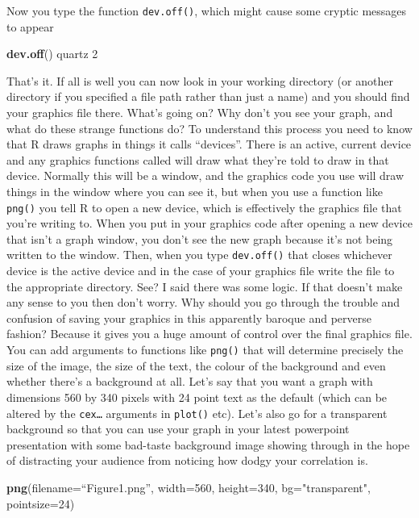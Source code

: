 \documentclass[
]{book}
\newenvironment{Shaded}{\begin{snugshade}}{\end{snugshade}}
\newcommand{\DataTypeTok}[1]{\textcolor[rgb]{0.13,0.29,0.53}{#1}}
\newcommand{\DecValTok}[1]{\textcolor[rgb]{0.00,0.00,0.81}{#1}}
\newcommand{\KeywordTok}[1]{\textcolor[rgb]{0.13,0.29,0.53}{\textbf{#1}}}
\newcommand{\NormalTok}[1]{#1}
\newcommand{\StringTok}[1]{\textcolor[rgb]{0.31,0.60,0.02}{#1}}
\begin{document}
Now you type the function \texttt{dev.off()}, which might cause some cryptic messages to appear

\begin{Shaded}
\begin{Highlighting}[]
\KeywordTok{dev.off}\NormalTok{()}
\NormalTok{quartz }
    \DecValTok{2}
\end{Highlighting}
\end{Shaded}

That's it. If all is well you can now look in your working directory (or another directory if you specified a file path rather than just a name) and you should find your graphics file there. What's going on? Why don't you see your graph, and what do these strange functions do? To understand this process you need to know that R draws graphs in things it calls ``devices''. There is an active, current device and any graphics functions called will draw what they're told to draw in that device. Normally this will be a window, and the graphics code you use will draw things in the window where you can see it, but when you use a function like \texttt{png()} you tell R to open a new device, which is effectively the graphics file that you're writing to. When you put in your graphics code after opening a new device that isn't a graph window, you don't see the new graph because it's not being written to the window. Then, when you type \texttt{dev.off()} that closes whichever device is the active device and in the case of your graphics file write the file to the appropriate directory. See? I said there was some logic. If that doesn't make any sense to you then don't worry.
Why should you go through the trouble and confusion of saving your graphics in this apparently baroque and perverse fashion? Because it gives you a huge amount of control over the final graphics file. You can add arguments to functions like \texttt{png()} that will determine precisely the size of the image, the size of the text, the colour of the background and even whether there's a background at all. Let's say that you want a graph with dimensions 560 by 340 pixels with 24 point text as the default (which can be altered by the \texttt{cex\ldots{}} arguments in \texttt{plot()} etc). Let's also go for a transparent background so that you can use your graph in your latest powerpoint presentation with some bad-taste background image showing through in the hope of distracting your audience from noticing how dodgy your correlation is.

\begin{Shaded}
\begin{Highlighting}[]
\KeywordTok{png}\NormalTok{(}\DataTypeTok{filename=}\NormalTok{“Figure1.png”, }\DataTypeTok{width=}\DecValTok{560}\NormalTok{, }\DataTypeTok{height=}\DecValTok{340}\NormalTok{, }\DataTypeTok{bg=}\StringTok{"transparent"}\NormalTok{, }\DataTypeTok{pointsize=}\DecValTok{24}\NormalTok{)}
\end{Highlighting}
\end{Shaded}
\end{document}
